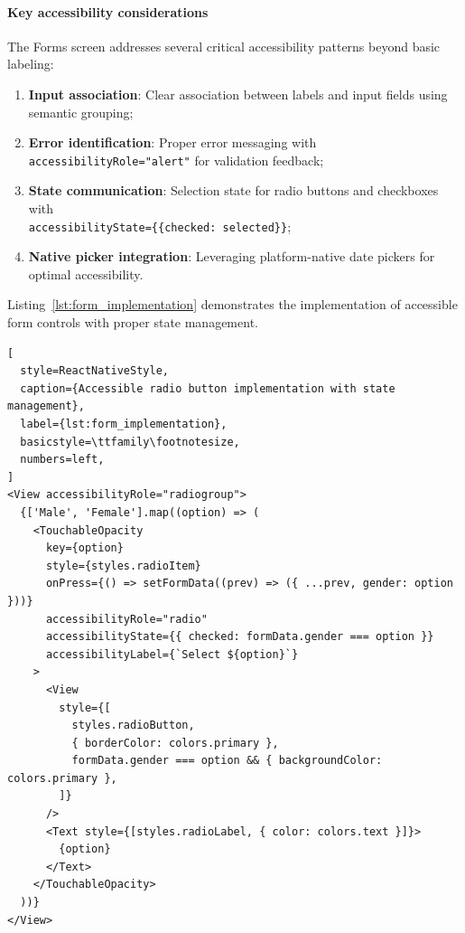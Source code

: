 \paragraph{Key accessibility considerations}

The Forms screen addresses several critical accessibility patterns beyond basic labeling:

\begin{enumerate}
    \item \textbf{Input association}: Clear association between labels and input fields using semantic grouping;
    
    \item \textbf{Error identification}: Proper error messaging with \texttt{accessibilityRole="alert"} for validation feedback;
    
    \item \textbf{State communication}: Selection state for radio buttons and checkboxes with \\ \texttt{accessibilityState=\{\{checked: selected\}\}};
    
    \item \textbf{Native picker integration}: Leveraging platform-native date pickers for optimal accessibility.
\end{enumerate}

Listing~\ref{lst:form_implementation} demonstrates the implementation of accessible form controls with proper state management.

\begin{lstlisting}[
  style=ReactNativeStyle,
  caption={Accessible radio button implementation with state management},
  label={lst:form_implementation},
  basicstyle=\ttfamily\footnotesize,
  numbers=left,
]
<View accessibilityRole="radiogroup">
  {['Male', 'Female'].map((option) => (
    <TouchableOpacity
      key={option}
      style={styles.radioItem}
      onPress={() => setFormData((prev) => ({ ...prev, gender: option }))}
      accessibilityRole="radio"
      accessibilityState={{ checked: formData.gender === option }}
      accessibilityLabel={`Select ${option}`}
    >
      <View
        style={[
          styles.radioButton,
          { borderColor: colors.primary },
          formData.gender === option && { backgroundColor: colors.primary },
        ]}
      />
      <Text style={[styles.radioLabel, { color: colors.text }]}>
        {option}
      </Text>
    </TouchableOpacity>
  ))}
</View>
\end{lstlisting}

